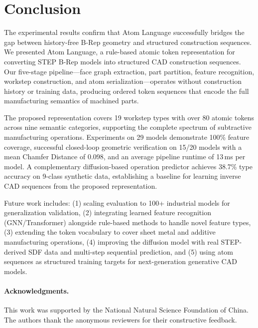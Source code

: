 \documentclass{styles/svproc}
\begin{document}
\section{Conclusion}
\label{sec:conclusion}
The experimental results confirm that Atom Language successfully bridges the gap between history-free B-Rep geometry and structured construction sequences. We presented Atom Language, a rule-based atomic token representation for converting STEP B-Rep models into structured CAD construction sequences. Our five-stage pipeline---face graph extraction, part partition, feature recognition, workstep construction, and atom serialization---operates without construction history or training data, producing ordered token sequences that encode the full manufacturing semantics of machined parts.

The proposed representation covers 19 workstep types with over 80 atomic tokens across nine semantic categories, supporting the complete spectrum of subtractive manufacturing operations. Experiments on 29 models demonstrate 100\% feature coverage, successful closed-loop geometric verification on 15/20 models with a mean Chamfer Distance of 0.098, and an average pipeline runtime of 13\,ms per model. A complementary diffusion-based operation predictor achieves 38.7\% type accuracy on 9-class synthetic data, establishing a baseline for learning inverse CAD sequences from the proposed representation.

Future work includes: (1) scaling evaluation to 100+ industrial models for generalization validation, (2) integrating learned feature recognition (GNN/Transformer) alongside rule-based methods to handle novel feature types, (3) extending the token vocabulary to cover sheet metal and additive manufacturing operations, (4) improving the diffusion model with real STEP-derived SDF data and multi-step sequential prediction, and (5) using atom sequences as structured training targets for next-generation generative CAD models.

\paragraph{Acknowledgments.} This work was supported by the National Natural Science Foundation of China. The authors thank the anonymous reviewers for their constructive feedback.
\end{document}
